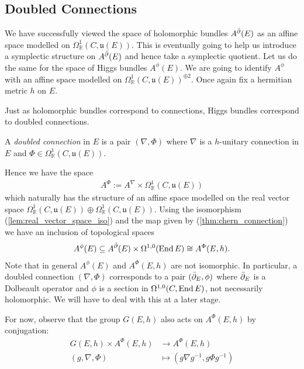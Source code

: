 \documentclass[12pt]{ociamthesis}  %
\begin{document}

\subsection{Doubled Connections}

We have successfully viewed the space of holomorphic bundles $A^{\bar{\partial}} (E)$
as an affine space modelled on
$\Omega^1_{\mathbb{R}}(C,\mathfrak{u}(E))$. This is eventually going
to help us introduce a symplectic structure on $A^{\bar{\partial}} (E)$ and hence
take a symplectic quotient. Let us do the same for the space of Higgs
bundles $A^\phi(E)$. We are going to identify $A^{\phi}$ with an affine
space modelled on $\Omega^1_{\mathbb{R}}(C,\mathfrak u(E))^{\oplus 2}$.
Once again fix a hermitian metric $h$ on $E$.

Just as holomorphic bundles correspond to connections, Higgs bundles
correspond to doubled connections.

\begin{definition}
  A \emph{doubled connection} in $E$ is a pair $(\nabla,\Phi)$
  where $\nabla$ is a $h$-unitary connection in $E$ and
  $\Phi\in\Omega^1_{\mathbb{R}}(C,\mathfrak u(E))$.
\end{definition}

Hence we have the space
\begin{align}\label{eq:doubled_connections_space}
  A^{\Phi} := A^\nabla \times \Omega^1_{\mathbb{R}}(C,\mathfrak u(E))
\end{align}
which naturally has the structure of an affine space modelled on
the real vector space
$\Omega^1_{\mathbb{R}}(C,\mathfrak u(E))\oplus\Omega_{\mathbb{R}}^1(C,\mathfrak u(E))$. Using the isomorphism (\ref{lem:real_vector_space_iso})
and the map given by (\ref{thm:chern_connection}) we have an inclusion
of topological spaces
\begin{align*}
  A^\phi(E) \subseteq A^{\bar{\partial}} (E) \times \Omega^{1,0}(\operatorname{End} E) \cong A^\Phi (E,h).
\end{align*}
Note that in general $A^\phi(E)$ and $A^\Phi (E,h)$ are not isomorphic. In
particular, a doubled connection $(\nabla,\Phi)$ corresponds to
a pair $(\bar{\partial}_E,\phi)$ where $\bar{\partial}_E$ is a Dolbeault operator and
$\phi$ is a section in $\Omega^{1,0}(C,\operatorname{End} E)$, not necessarily
holomorphic. We will have to deal with this at a later stage.

For now, observe that the group $G(E,h)$ also acts on $A^\Phi (E,h)$
by conjugation:
\begin{align*}
  G(E,h) \times A^\Phi (E,h) & \to A^\Phi (E,h)                        \\
  (g,\nabla,\Phi)            & \mapsto (g\nabla{g}^{-1},g\Phi{g}^{-1})
\end{align*}
\end{document}
